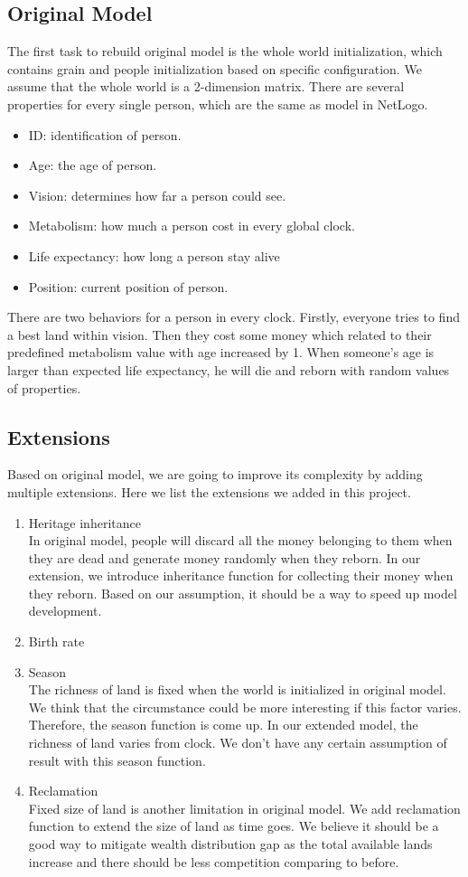 \subsection{Original Model}
The first task to rebuild original model is the whole world initialization, which contains grain and people initialization based on specific configuration. We assume that the whole world is a 2-dimension matrix. There are several properties for every single person, which are the same as model in NetLogo.
   \begin{itemize}
   	\item ID: identification of person.
   	\item Age: the age of person.
	\item Vision: determines how far a person could see.
	\item Metabolism: how much a person cost in every global clock.
	\item Life expectancy: how long a person stay alive
	\item Position: current position of person.
\end{itemize}
There are two behaviors for a person in every clock. Firstly, everyone tries to find a best land within vision. Then they cost some money which related to their predefined metabolism value with age increased by 1. When someone's age is larger than expected life expectancy, he will die and reborn with random values of properties.
\subsection{Extensions}
Based on original model, we are going to improve its complexity by adding multiple extensions. Here we list the extensions we added in this project. 
\begin{enumerate}
	\item Heritage inheritance\\
	In original model, people will discard all the money belonging to them when they are dead and generate money randomly when they reborn. In our extension, we introduce inheritance function for collecting their money when they reborn. Based on our assumption, it should be a way to speed up model development. 
	\item Birth rate\\
	
	\item Season\\
	The richness of land is fixed when the world is initialized in original model. We think that the circumstance could be more interesting if this factor varies. Therefore, the season function is come up. In our extended model, the richness of land varies from clock. We don't have any certain assumption of result with this season function.
	\item Reclamation\\
	Fixed size of land is another limitation in original model. We add reclamation function to extend the size of land as time goes. We believe it should be a good way to mitigate wealth distribution gap as the total available lands increase and there should be less competition comparing to before. 
\end{enumerate}
